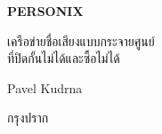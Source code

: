 \thispagestyle{empty}
\begin{center}
  {\sffamily\bfseries\fontsize{34}{40}\selectfont PERSONIX\par}
  \vspace{2.2em}
  {\rmfamily\large เครือข่ายชื่อเสียงแบบกระจายศูนย์\\[0.25em]
   ที่ปิดกั้นไม่ได้และซื้อไม่ได้\par}
\end{center}
\begin{center}
  {\rmfamily\Large Pavel Kudrna\par}
  \vspace{0.45em}
  {\rmfamily\small กรุงปราก\quad\textbullet{}\par}
\end{center}
\clearpage
